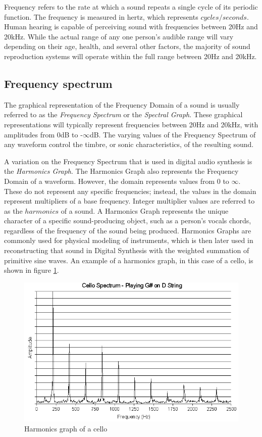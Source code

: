\documentclass[a4paper,12pt]{report}
\begin{document}
Frequency refers to the rate at which a sound repeats a single cycle of its periodic function. The frequency is measured in hertz, which represents $cycles/seconds$. Human hearing is capable of perceiving sound with frequencies between 20Hz and 20kHz. While the actual range of any one person's audible range will vary depending on their age, health, and several other factors, the majority of sound reproduction systems will operate within the full range between 20Hz and 20kHz. 

\subsection{Frequency spectrum}
\label{subsec:freqspect}
The graphical representation of the Frequency Domain of a sound is usually referred to as the \emph{Frequency \-Spectrum} or the \emph{Spectral \-Graph}. These graphical representations will typically represent frequencies between 20Hz and 20kHz, with amplitudes from 0dB to -$\infty$dB. The varying values of the Frequency Spectrum of any waveform control the timbre, or sonic characteristics, of the resulting sound.

A variation on the Frequency Spectrum that is used in digital audio synthesis is the \emph{Harmonics \-Graph}. The Harmonics Graph also represents the Frequency Domain of a waveform. However, the domain represents values from 0 to $\infty$. These do not represent any specific frequencies; instead, the values in the domain represent multipliers of a base frequency. Integer multiplier values are referred to as the $harmonics$ of a sound. A Harmonics Graph represents the unique character of a specific sound-producing object, such as a person's vocals chords, regardless of the frequency of the sound being produced. Harmonics Graphs are commonly used for physical modeling of instruments, which is then later used in reconstructing that sound in Digital Synthesis with the weighted summation of primitive sine waves. An example of a harmonics graph, in this case of a cello, is shown in figure \ref{fig:CelloHarmonicsGraph}.

\begin{figure}[h]
    \centering
    \includegraphics[width=36em]{CelloHarmonicsGraph.png}
    \caption{Harmonics graph of a cello \cite{cellotone}}
    \label{fig:CelloHarmonicsGraph}
\end{figure}
\end{document}
